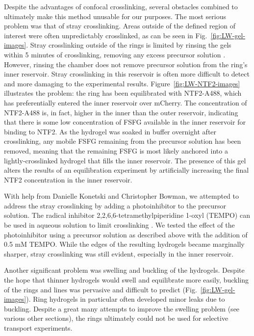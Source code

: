 Despite the advantages of confocal crosslinking, several obstacles combined to ultimately make this method unusable for our purposes.  The most serious problem was that of stray crosslinking.  Areas outside of the defined region of interest were often unpredictably crosslinked, as can be seen in Fig.~\ref{fig:LW-gel-images}.  Stray crosslinking outside of the rings is limited by rinsing the gels within 5 minutes of crosslinking, removing any excess precursor solution \cite{paustian13}.  However, rinsing the chamber does not remove precursor solution from the ring's inner reservoir.  Stray crosslinking in this reservoir is often more difficult to detect and more damaging to the experimental results. Figure~\ref{fig:LW-NTF2-images} illustrates the problem: the ring has been equilibrated with NTF2-A488, which has preferentially entered the inner reservoir over mCherry.  The concentration of NTF2-A488 is, in fact, higher in the inner than the outer reservoir, indicating that there is some low concentration of FSFG available in the inner reservoir for binding to NTF2.  As the hydrogel was soaked in buffer overnight after crosslinking, any mobile FSFG remaining from the precursor solution has been removed, meaning that the remaining FSFG is most likely anchored into a lightly-crosslinked hydrogel that fills the inner reservoir.  The presence of this gel alters the results of an equilibration experiment by artificially increasing the final NTF2 concentration in the inner reservoir.

With help from Danielle Konetski and Christopher Bowman, we attempted to address the stray crosslinking by adding a photoinhibitor to the precursor solution.  The radical inhibitor 2,2,6,6-tetramethylpiperidine 1-oxyl (TEMPO) can be used in aqueous solution to limit crosslinking \cite{chatani14}.  We tested the effect of the photoinhibitor using a precursor solution as described above with the addition of 0.5 mM TEMPO.  While the edges of the resulting hydrogels became marginally sharper, stray crosslinking was still evident, especially in the inner reservoir.


Another significant problem was swelling and buckling of the hydrogels.  Despite the hope that thinner hydrogels would swell and equilibrate more easily, buckling of the rings and lines was pervasive and difficult to predict (Fig.~\ref{fig:LW-gel-images}).  Ring hydrogels in particular often developed minor leaks due to buckling.  Despite a great many attempts to improve the swelling problem (see various other sections), the rings ultimately could not be used for selective transport experiments.

